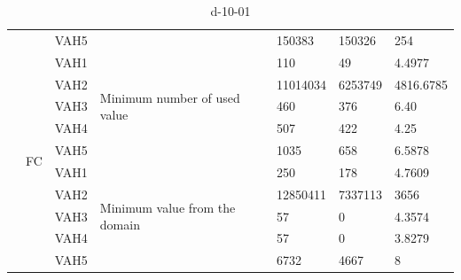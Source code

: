 \documentclass[14pt]{scrartcl} %
\begin{document}
\begin{table}[ht]
{\begin{tabular}{|l|l|l|l|l|l|l|}
                          &                      & VAH5 &                                                &    150383    &     150326        &        254     \\ \cline{2-7} 
  \rowcolor{yellow}                          & \multirow{10}{*}{FC} & VAH1 & \multirow{5}{*}{Minimum number of used value}  & 110       & 49            &     4.4977        \\ \cline{3-3} \cline{5-7} 
                          &                      & VAH2 &                                                & 11014034       &  6253749           &        4816.6785     \\ \cline{3-3} \cline{5-7} 
                          &                      & VAH3 &                                                &   460     &376             &     6.40        \\ \cline{3-3} \cline{5-7} 
                          &                      & VAH4 &                                                &   507     &        422     &           4.25  \\ \cline{3-3} \cline{5-7} 
                          &                      & VAH5 &                                                &   1035     &     658        & 6.5878            \\ \cline{3-7} 
                          &                      & VAH1 & \multirow{5}{*}{Minimum value from the domain} &   250     &        178     &      4.7609       \\ \cline{3-3} \cline{5-7} 
                          &                      & VAH2 &                                                &  12850411      &   7337113 &     3656        \\ \cline{3-3} \cline{5-7} 
                          &                      & VAH3 &                                                & 57       &  0           &    4.3574     \\ \cline{3-3} \cline{5-7} 
\rowcolor{green}    &                      &  {VAH4} &                                                &   57      &  0           &    3.8279         \\ \cline{3-3} \cline{5-7} 
             &                      & VAH5 &                                                & 6732       &            4667 &    8         \\ \hline
\end{tabular}
}
\caption{d-10-01}
\end{table}
\end{document}
